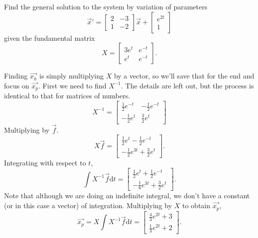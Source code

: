 \begin{example}
	Find the general solution to the system by variation of parameters
	\begin{equation*}
		\vec{x}' = \begin{bmatrix}
			2 & -3 \\
			1 & -2
		\end{bmatrix}\vec{x} + \begin{bmatrix}
			e^{2t} \\
			1
		\end{bmatrix}
	\end{equation*}
	given the fundamental matrix
	\begin{equation*}
		X = \begin{bmatrix}
			3e^t & e^{-t} \\
			e^t & e^{-t}
		\end{bmatrix}.
	\end{equation*}
\end{example}
\noindent
Finding $\vec{x_h}$ is simply multiplying $X$ by a vector, so we'll save that for the end and focus on $\vec{x_p}$. First we need to find $X^{-1}$. The details are left out, but the process is identical to that for matrices of numbers.
\begin{equation*}
	X^{-1} = \begin{bmatrix}
		\frac{1}{2}e^{-t} & -\frac{1}{2}e^{-t} \\
		-\frac{1}{2}e^t & \frac{3}{2}e^t
	\end{bmatrix}
\end{equation*}
Multiplying by $\vec{f}$.
\begin{equation*}
	X\vec{f} = \begin{bmatrix}
		\frac{1}{2}e^t - \frac{1}{2}e^{-t} \\
		-\frac{1}{2}e^{3t} + \frac{3}{2}e^t
	\end{bmatrix}.
\end{equation*}
Integrating with respect to $t$,
\begin{equation*}
	\int{X^{-1}\vec{f} \mathrm{d}t} = \begin{bmatrix}
		\frac{1}{2}e^t + \frac{1}{2}e^{-t} \\
		-\frac{1}{6}e^{3t} + \frac{3}{2}e^t
	\end{bmatrix}.
\end{equation*}
Note that although we are doing an indefinite integral, we don't have a constant (or in this case a vector) of integration.
Multiplying by $X$ to obtain $\vec{x_p}$,
\begin{equation*}
	\vec{x_p} = X\int{X^{-1}\vec{f} \mathrm{d}t} = \begin{bmatrix}
		\frac{4}{3}e^{2t} + 3 \\
		\frac{1}{3}e^{2t} + 2
	\end{bmatrix}.
\end{equation*}
